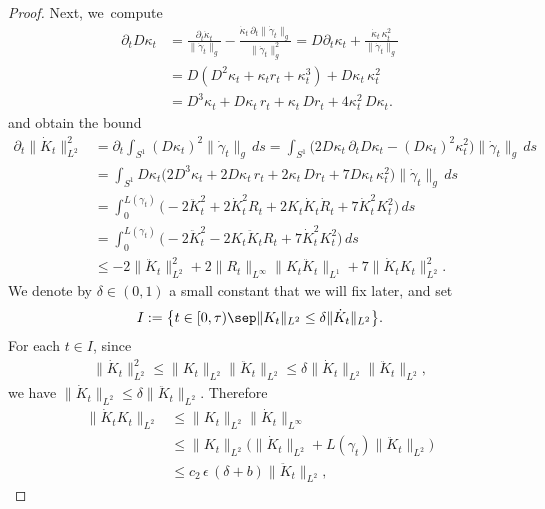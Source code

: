 \begin{proof}
Next, we~compute
\begin{align*}
\partial_t D\kappa_t
&=
\frac{\partial_t \dot \kappa_t}{\|\dot\gamma_t\|_g}
-
\frac{\dot \kappa_t\,\partial_t\|\dot\gamma_t\|_g}{\|\dot\gamma_t\|_g^2}
=
D\partial_t \kappa_t + \frac{\dot \kappa_t\,\kappa_t^2}{\|\dot\gamma_t\|_g}\\
&=
D(D^2 \kappa_t + \kappa_t r_t + \kappa_t^3) + D\kappa_t\,\kappa_t^2\\
&=
D^3 \kappa_t + D\kappa_t\, r_t + \kappa_t\,Dr_t + 4\kappa_t^2\,D\kappa_t .
\end{align*}
and obtain the bound
\begin{align*}
\partial_t \|\dot K_t\|_{L^2}^2
&=
\partial_t \int_{S^1} (D\kappa_t)^2\|\dot\gamma_t\|_g\,ds
=
\int_{S^1} \big(2 D\kappa_t\,\partial_tD\kappa_t - (D\kappa_t)^2\kappa_t^2 \big)\|\dot\gamma_t\|_g\,ds\\
&=
\int_{S^1} D\kappa_t\big(2 D^3\kappa_t + 2D\kappa_t\,r_t + 2\kappa_t\,Dr_t + 7D\kappa_t\,\kappa_t^2 \big)\|\dot\gamma_t\|_g\,ds\\
&=
\int_0^{L(\gamma_t)} \Big(\! -2 \ddot K_t^2 + 2\dot K_t^2 R_t + 2K_t \dot K_t \dot R_t + 7\dot K_t^2 K_t^2 \Big)\,ds\\
&=
\int_0^{L(\gamma_t)} \Big(\! -2 \ddot K_t^2 - 2 K_t \ddot K_t R_t + 7\dot K_t^2 K_t^2 \Big)\,ds\\
&\leq -2 \|\ddot K_t\|_{L^2}^2 + 2 \|R_t\|_{L^\infty} \|K_t \ddot K_t\|_{L^1} + 7 \|\dot K_t K_t\|_{L^2}^2.
\end{align*}
We denote by $\delta\in(0,1)$ a small constant that we will fix later, and set
\begin{align*}
I:=\big\{ t\in[0,\tau)\sep \|K_t\|_{L^2} \leq \delta \|\dot K_t\|_{L^2} \big\}.
\end{align*}
For each $t\in I$, since
\begin{align*}
\|\dot K_t\|_{L^2}^2
\leq
\|K_t\|_{L^2}\|\ddot K_t\|_{L^2}
\leq
\delta\|\dot K_t\|_{L^2}\|\ddot K_t\|_{L^2},
\end{align*}
we have $\|\dot K_t\|_{L^2}\leq \delta\|\ddot K_t\|_{L^2}$. Therefore
\begin{equation}
\label{e:Cinfty_Zoll_estimates_2_1}
\begin{split}
\|\dot K_t K_t\|_{L^2}
&\leq
\|K_t\|_{L^2} \|\dot K_t\|_{L^\infty}\\
&\leq
\|K_t\|_{L^2} \big(\|\dot K_t\|_{L^2} + L(\gamma_t)\|\ddot K_t\|_{L^2}\big)\\
&\leq
c_2\,\epsilon\,(\delta+b)\|\ddot K_t\|_{L^2},
\end{split}

\end{equation}
\end{proof}
